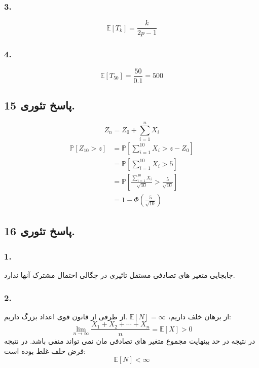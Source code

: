 \documentclass[]{article}
\begin{document}
\subsubsection{3.}
\begin{equation}
	\nonumber
	\mathbb{E}[T_k] = \frac{k}{2p-1}
\end{equation}
\subsubsection{4.}
\begin{equation}
	\nonumber
	\mathbb{E}[T_{50}] = \frac{50}{0.1} = 500
\end{equation}
\newpage
\subsection{پاسخ تئوری 15.}
\begin{equation}
	\nonumber
	Z_n = Z_0 + \sum_{i = 1}^{n} X_i
\end{equation}
\begin{equation}
	\nonumber
	\begin{split}
		\mathbb{P}[Z_{10} > z] &= \mathbb{P}[\sum_{i = 1}^{10}X_i > z - Z_0]\\
		&= \mathbb{P}[\sum_{i = 1}^{10}X_i > 5]\\
		&=\mathbb{P}[\frac{\sum_{i = 1}^{10}X_i}{\sqrt{10}}> \frac{5}{\sqrt{10}}]\\
		&= 1- \Phi(\frac{5}{\sqrt{10}})
	\end{split}
\end{equation}
\newpage
\subsection{پاسخ تئوری 16.}
\subsubsection{1.}
جابجایی متغیر های تصادفی مستقل تاثیری در چگالی احتمال مشترک آنها ندارد.
\subsubsection{2.}
از برهان خلف داریم، 
$\mathbb{E}[N] = \infty$
.از طرفی از قانون قوی اعداد بزرگ داریم:
\begin{equation}
	\nonumber
	\lim_{n\rightarrow \infty} \frac{X_1 + X_2 + \cdots + X_n}{n} = \mathbb{E}[X] > 0
\end{equation}
در نتیجه در حد بینهایت مجموع متغیر های تصادفی مان نمی تواند منفی باشد. در نتیجه فرض خلف غلط بوده است:
\begin{equation}
	\nonumber
	\mathbb{E}[N] < \infty
\end{equation}
\end{document}
